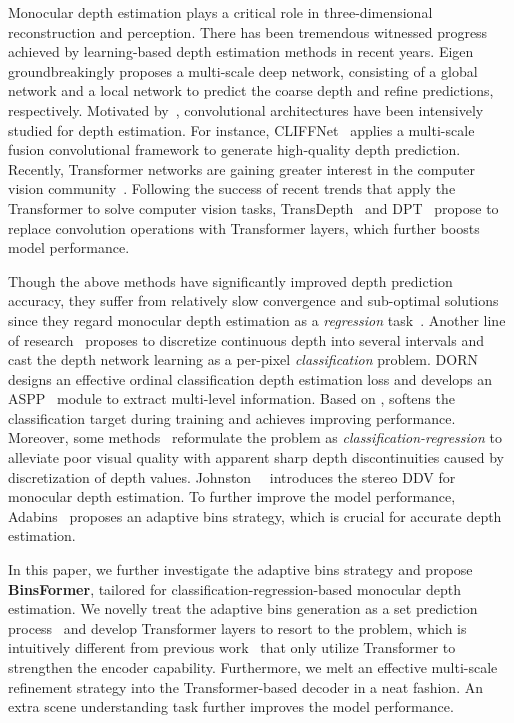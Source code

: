 \documentclass[runningheads]{llncs}
\begin{document}
Monocular depth estimation plays a critical role in three-dimensional reconstruction and perception. There has been tremendous witnessed progress achieved by learning-based depth estimation methods in recent years. Eigen~\etal~\cite{eigen2014depth} groundbreakingly proposes a multi-scale deep network, consisting of a global network and a local network to predict the coarse depth and refine predictions, respectively. Motivated by~\cite{eigen2014depth}, convolutional architectures have been intensively studied for depth estimation. For instance, CLIFFNet~\cite{wang2020cliffnet} applies a multi-scale fusion convolutional framework to generate high-quality depth prediction. Recently, Transformer networks are gaining greater interest in the computer vision community~\cite{dosovitskiy2020vit,liu2021swin,carion2020detr,zheng2021setr}. Following the success of recent trends that apply the Transformer to solve computer vision tasks, TransDepth~\cite{yang2021transdepth} and DPT~\cite{ranftl2021dpt} propose to replace convolution operations with Transformer layers, which further boosts model performance.

Though the above methods have significantly improved depth prediction accuracy, they suffer from relatively slow convergence and sub-optimal solutions since they regard monocular depth estimation as a \textit{regression} task~\cite{fu2018dorn}. Another line of research~\cite{fu2018dorn,diaz2019soft} proposes to discretize continuous depth into several intervals and cast the depth network learning as a per-pixel \textit{classification} problem. DORN~\cite{fu2018dorn} designs an effective ordinal classification depth estimation loss and develops an ASPP~\cite{chen2017deeplab} module to extract multi-level information. Based on \cite{fu2018dorn}, \cite{diaz2019soft} softens the classification target during training and achieves improving performance. Moreover, some methods~\cite{bhat2021adabins,johnston2020self} reformulate the problem as \textit{classification-regression} to alleviate poor visual quality with apparent sharp depth discontinuities caused by discretization of depth values. Johnston~\etal~\cite{johnston2020self} introduces the stereo DDV for monocular depth estimation. To further improve the model performance, Adabins~\cite{bhat2021adabins} proposes an adaptive bins strategy, which is crucial for accurate depth estimation.

In this paper, we further investigate the adaptive bins strategy and propose \textbf{BinsFormer}, tailored for classification-regression-based monocular depth estimation. We novelly treat the adaptive bins generation as a set prediction process~\cite{carion2020detr} and develop Transformer layers to resort to the problem, which is intuitively different from previous work~\cite{ranftl2021dpt,yang2021transdepth} that only utilize Transformer to strengthen the encoder capability. Furthermore, we melt an effective multi-scale refinement strategy into the Transformer-based decoder in a neat fashion. An extra scene understanding task further improves the model performance.
\end{document}
